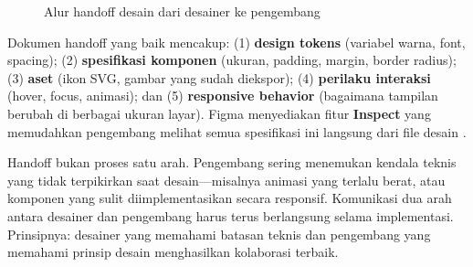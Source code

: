 \begin{figure}[H]
\centering
{}
\caption{Alur handoff desain dari desainer ke pengembang}
\end{figure}

Dokumen handoff yang baik mencakup: (1) \textbf{design tokens} (variabel warna, font, spacing); (2) \textbf{spesifikasi komponen} (ukuran, padding, margin, border radius); (3) \textbf{aset} (ikon SVG, gambar yang sudah diekspor); (4) \textbf{perilaku interaksi} (hover, focus, animasi); dan (5) \textbf{responsive behavior} (bagaimana tampilan berubah di berbagai ukuran layar). Figma menyediakan fitur \textbf{Inspect} yang memudahkan pengembang melihat semua spesifikasi ini langsung dari file desain \cite{figmaDocs}.

\begin{catatan}
Handoff bukan proses satu arah. Pengembang sering menemukan kendala teknis yang tidak terpikirkan saat desain---misalnya animasi yang terlalu berat, atau komponen yang sulit diimplementasikan secara responsif. Komunikasi dua arah antara desainer dan pengembang harus terus berlangsung selama implementasi. Prinsipnya: desainer yang memahami batasan teknis dan pengembang yang memahami prinsip desain menghasilkan kolaborasi terbaik.
\end{catatan}

